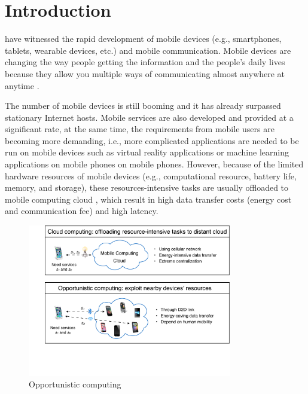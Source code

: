 \documentclass[10pt,journal,compsoc]{IEEEtran}
\begin{document}
\IEEEdisplaynontitleabstractindextext

\IEEEpeerreviewmaketitle


\ifCLASSOPTIONcompsoc
{}
\else
\section{Introduction}
\label{sec:introduction}
\fi


 have witnessed the rapid development of mobile devices (e.g., smartphones, tablets, wearable devices, etc.) and mobile communication. Mobile devices are changing the way people getting the information and the people’s daily lives because they allow you multiple ways of communicating almost anywhere at anytime \cite{satyanarayanan2010mobile}.

The number of mobile devices is still booming and it has already surpassed stationary Internet hosts.
Mobile services are also developed and provided at a significant rate, at the same time, the requirements from mobile users are becoming more demanding, i.e., more complicated applications are needed to be run on mobile devices such as virtual reality applications \cite{bastug2017toward} or machine learning applications on mobile phones \cite{abadi2016tensorflow} on mobile phones. However, because of the limited hardware resources of mobile devices (e.g., computational resource, battery life, memory, and storage), these resources-intensive tasks are usually offloaded to mobile computing cloud \cite{dinh2013survey}, which result in high data transfer costs (energy cost and communication fee) and high latency.

\begin{figure}[!t]
\centering
\includegraphics[width=3.5in]{./img/pic1.pdf}
\caption{Opportunistic computing}
\label{Opportunistic computing}
\end{figure}
\end{document}
